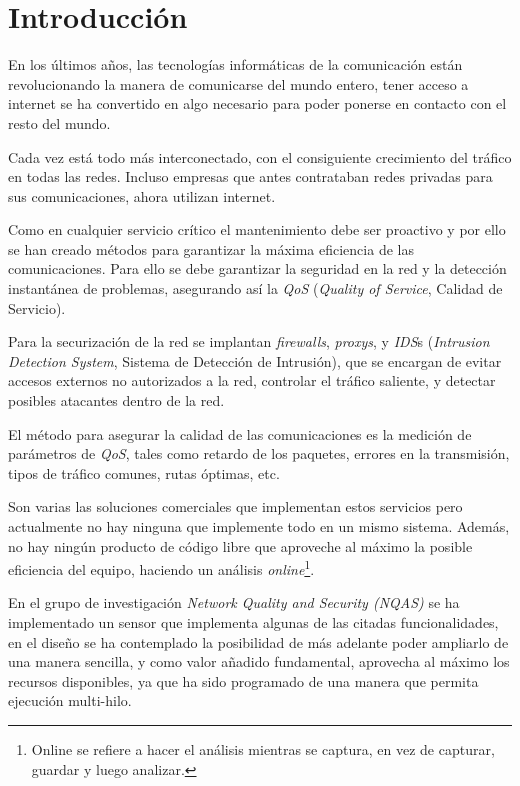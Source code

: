
\section{Introducción}

En los últimos años, las tecnologías informáticas de la comunicación están revolucionando la manera de comunicarse del mundo entero, tener acceso a internet se ha convertido en algo necesario para poder ponerse en contacto con el resto del mundo.

Cada vez está todo más interconectado, con el consiguiente crecimiento del tráfico en todas las redes. Incluso empresas que antes contrataban redes privadas para sus comunicaciones, ahora utilizan internet.

Como en cualquier servicio crítico el mantenimiento debe ser proactivo y por ello se han creado métodos para garantizar la máxima eficiencia de las comunicaciones. Para ello se debe garantizar la seguridad en la red y la detección instantánea de problemas, asegurando así la \textit{QoS} (\textit{Quality of Service}, Calidad de Servicio).

Para la securización de la red se implantan \textit{firewalls}, \textit{proxys}, y \textit{IDS}s (\textit{Intrusion Detection System}, Sistema de Detección de Intrusión), que se encargan de evitar accesos externos no autorizados a la red, controlar el tráfico saliente, y detectar posibles atacantes dentro de la red.

El método para asegurar la calidad de las comunicaciones es la medición de parámetros de \textit{QoS}, tales como retardo de los paquetes, errores en la transmisión, tipos de tráfico comunes, rutas óptimas, etc.

Son varias las soluciones comerciales que implementan estos servicios pero actualmente no hay ninguna que implemente todo en un mismo sistema. Además, no hay ningún producto de código libre que aproveche al máximo la posible eficiencia del equipo, haciendo un análisis \textit{online}\footnote{Online se refiere a hacer el análisis mientras se captura, en vez de capturar, guardar y luego analizar.}.

En el grupo de investigación \textit{Network Quality and Security (NQAS)} se ha implementado un sensor que implementa algunas de las citadas funcionalidades, en el diseño se ha contemplado la posibilidad de más adelante poder ampliarlo de una manera sencilla, y como valor añadido fundamental, aprovecha al máximo los recursos disponibles, ya que ha sido programado de una manera que permita ejecución multi-hilo.

